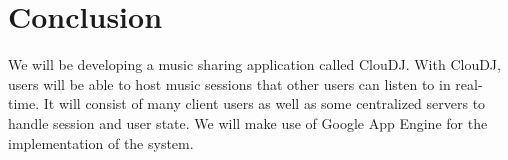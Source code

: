 \section{Conclusion}
    \label{sec:conc}
We will be developing a music sharing application 
called ClouDJ. With ClouDJ, users will be able to 
host music sessions that other users can listen to 
in real-time. It will consist of many client users 
as well as some centralized servers to handle 
session and user state. We will make use of Google 
App Engine for the implementation of the system.
